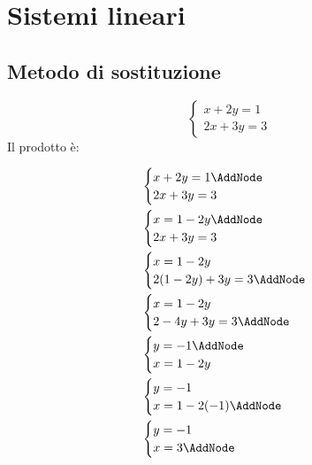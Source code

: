 \chapter{Sistemi lineari}
\section{Metodo di sostituzione}
\label{sec:metosdosostituzione}
\label{cha:SistemiLineari}
\tcbstartrecording
\begin{exercise}
\[\begin{cases}
	x+2y=1\\
	2x+3y=3
\end{cases}
\]
	\tcblower
	Il prodotto è:
\begin{NodesList}
	\begin{align*}
	&\begin{cases}
	x+2y=1\AddNode\\
	2x+3y=3
	\end{cases}\\
	&\begin{cases}
	x=1-2y\AddNode\\
	2x+3y=3
	\end{cases}\\
	&\begin{cases}
	x=1-2y\\
	2(1-2y)+3y=3\AddNode\\
	\end{cases}\\
	&\begin{cases}
	x=1-2y\\
	2-4y+3y=3\AddNode\\
	\end{cases}\\
	&\begin{cases}
	y=-1\AddNode\\
	x=1-2y\\
	\end{cases}\\
	&\begin{cases}
	y=-1\\
	x=1-2(-1) \AddNode\\
	\end{cases}\\
	&\begin{cases}
	y=-1\\
	x=3 \AddNode\\
	\end{cases}\\
	\end{align*}

\end{NodesList}
\end{exercise}
